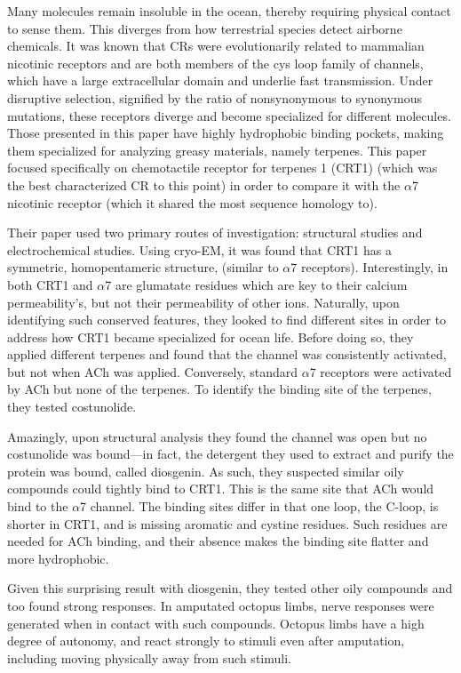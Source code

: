 \documentclass[12pt]{report}
\begin{document}
Many molecules remain insoluble in the ocean, thereby requiring physical contact to sense them. This diverges from how terrestrial species detect airborne chemicals. It was known that CRs were evolutionarily related to mammalian nicotinic receptors and are both members of the cys loop family of channels, which have a large extracellular domain and underlie fast transmission. Under disruptive selection, signified by the ratio of nonsynonymous to synonymous mutations, these receptors diverge and become specialized for different molecules. Those presented in this paper have highly hydrophobic binding pockets, making them specialized for analyzing greasy materials, namely terpenes. This paper focused specifically on chemotactile receptor for terpenes 1 (CRT1) (which was the best characterized CR to this point) in order to compare it with the $\alpha$7 nicotinic receptor (which it shared the most sequence homology to).\newline

Their paper used two primary routes of investigation: structural studies and electrochemical studies. Using cryo-EM, it was found that CRT1 has a symmetric, homopentameric structure, (similar to $\alpha$7 receptors). Interestingly, in both CRT1 and $\alpha$7 are glumatate residues which are key to their calcium permeability's, but not their permeability of other ions. Naturally, upon identifying such conserved features, they looked to find different sites in order to address how CRT1 became specialized for ocean life. Before doing so, they applied different terpenes and found that the channel was consistently activated, but not when ACh was applied. Conversely, standard $\alpha$7 receptors were activated by ACh but none of the terpenes. To identify the binding site of the terpenes, they tested costunolide.\newline

Amazingly, upon structural analysis they found the channel was open but no costunolide was bound---in fact, the detergent they used to extract and purify the protein was bound, called diosgenin. As such, they suspected similar oily compounds could tightly bind to CRT1. This is the same site that ACh would bind to the $\alpha$7 channel. The binding sites differ in that one loop, the C-loop, is shorter in CRT1, and is missing aromatic and cystine residues. Such residues are needed for ACh binding, and their absence makes the binding site flatter and more hydrophobic.\newline

Given this surprising result with diosgenin, they tested other oily compounds and too found strong responses. In amputated octopus limbs, nerve responses were generated when in contact with such compounds. Octopus limbs have a high degree of autonomy, and react strongly to stimuli even after amputation, including moving physically away from such stimuli.
\end{document}
